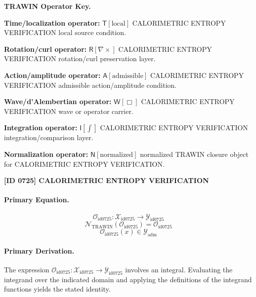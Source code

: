 \par\vspace{0.45\baselineskip}
\noindent\begin{minipage}[t]{\linewidth}
\begingroup
\small
\raggedright
\textbf{TRAWIN Operator Key.}\par
\noindent\textbf{Time/localization operator:} $\mathsf{T}\!\left[\mathrm{local}\right]$ CALORIMETRIC ENTROPY VERIFICATION local source condition.\par
\noindent\textbf{Rotation/curl operator:} $\mathsf{R}\!\left[\nabla\times\right]$ CALORIMETRIC ENTROPY VERIFICATION rotation/curl preservation layer.\par
\noindent\textbf{Action/amplitude operator:} $\mathsf{A}\!\left[\mathrm{admissible}\right]$ CALORIMETRIC ENTROPY VERIFICATION admissible action/amplitude condition.\par
\noindent\textbf{Wave/d'Alembertian operator:} $\mathsf{W}\!\left[\Box\right]$ CALORIMETRIC ENTROPY VERIFICATION wave or operator carrier.\par
\noindent\textbf{Integration operator:} $\mathsf{I}\!\left[\int\right]$ CALORIMETRIC ENTROPY VERIFICATION integration/comparison layer.\par
\noindent\textbf{Normalization operator:} $\mathsf{N}\!\left[\mathrm{normalized}\right]$ normalized TRAWIN closure object for CALORIMETRIC ENTROPY VERIFICATION.\par
\endgroup
\end{minipage}

\clearpage
\noindent\textbf{[ID 0725] CALORIMETRIC ENTROPY VERIFICATION}\par
\vspace{0.35em}
\paragraph{Primary Equation.}
\[
\mathcal{O}_{\mathrm{id0725}}:\mathcal{X}_{\mathrm{id0725}}\longrightarrow\mathcal{Y}_{\mathrm{id0725}}
\]
\[
\mathcal{N}_{\mathrm{TRAWIN}}(\mathcal{O}_{\mathrm{id0725}})=\mathcal{O}_{\mathrm{id0725}}
\]
\[
\mathcal{O}_{\mathrm{id0725}}(x)\in\mathcal{Y}_{\mathrm{adm}}
\]

\paragraph{Primary Derivation.}
The expression \( \mathcal{O}_{\mathrm{id0725}}:\mathcal{X}_{\mathrm{id0725}}\longrightarrow\mathcal{Y}_{\mathrm{id0725}} \) involves an integral. Evaluating the integrand over the indicated domain and applying the definitions of the integrand functions yields the stated identity.
